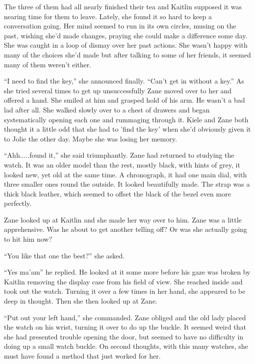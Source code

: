 The three of them had all nearly finished their tea and Kaitlin supposed it was nearing time for them to leave.  Lately, she found it so hard to keep a conversation going.  Her mind seemed to run in its own circles, musing on the past, wishing she'd made changes, praying she could make a difference some day.  She was caught in a loop of dismay over her past actions.  She wasn't happy with many of the choices she'd made but after talking to some of her friends, it seemed many of them weren't either.

``I need to find the key,'' she announced finally.  ``Can't get in without a key.''  As she tried several times to get up unsuccessfully Zane moved over to her and offered a hand.  She smiled at him and grasped hold of his arm.  He wasn't a bad lad after all.  She walked slowly over to a chest of drawers and began systematically opening each one and rummaging through it.  Kiele and Zane both thought it a little odd that she had to 'find the key' when she'd obviously given it to Jolie the other day.  Maybe she was losing her memory.  

``Ahh.....found it,'' she said triumphantly.  Zane had returned to studying the watch.  It was an older model than the rest, mostly black, with hints of grey, it looked new, yet old at the same time.  A chronograph, it had one main dial, with three smaller ones round the outside.  It looked beautifully made.  The strap was a thick black leather, which seemed to offset the black of the bezel even more perfectly.  

Zane looked up at Kaitlin and she made her way over to him.  Zane was a little apprehensive.  Was he about to get another telling off?  Or was she actually going to hit him now?

``You like that one the best?'' she asked.

``Yes ma'am'' he replied.  He looked at it some more before his gaze was broken by Kaitlin removing the display case from his field of view.  She reached inside and took out the watch.  Turning it over a few times in her hand, she appeared to be deep in thought.  Then she then looked up at Zane.

``Put out your left hand,'' she commanded.  Zane obliged and the old lady placed the watch on his wrist, turning it over to do up the buckle.  It seemed weird that she had presented trouble opening the door, but seemed to have no difficulty in doing up a small watch buckle.  On second thoughts, with this many watches, she must have found a method that just worked for her.

